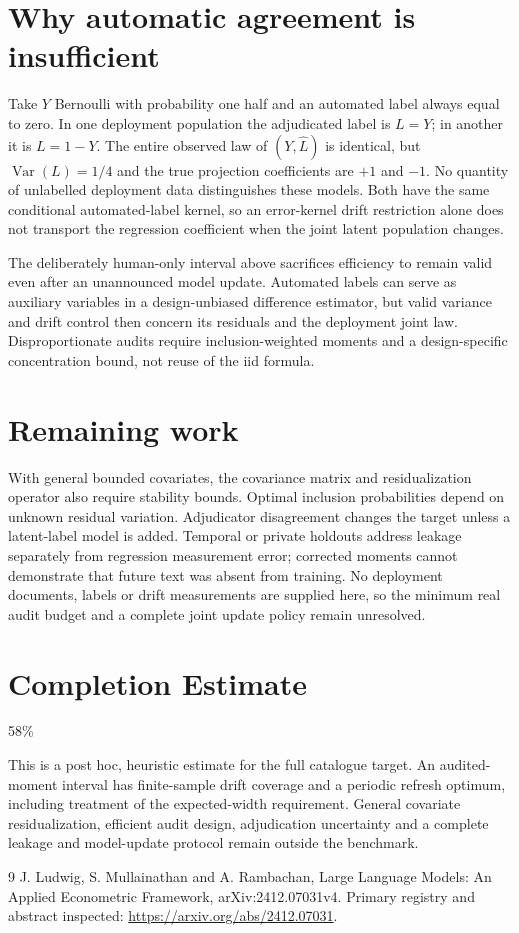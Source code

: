 \documentclass[11pt]{article}
\newcommand{\Var}{\operatorname{Var}}
\begin{document}
\section*{Why automatic agreement is insufficient}
Take $Y$ Bernoulli with probability one half and an automated label always equal to zero. In one deployment population the adjudicated label is $L=Y$; in another it is $L=1-Y$. The entire observed law of $(Y,\widehat L)$ is identical, but $\Var(L)=1/4$ and the true projection coefficients are $+1$ and $-1$. No quantity of unlabelled deployment data distinguishes these models. Both have the same conditional automated-label kernel, so an error-kernel drift restriction alone does not transport the regression coefficient when the joint latent population changes.

The deliberately human-only interval above sacrifices efficiency to remain valid even after an unannounced model update. Automated labels can serve as auxiliary variables in a design-unbiased difference estimator, but valid variance and drift control then concern its residuals and the deployment joint law. Disproportionate audits require inclusion-weighted moments and a design-specific concentration bound, not reuse of the iid formula.

\section*{Remaining work}
With general bounded covariates, the covariance matrix and residualization operator also require stability bounds. Optimal inclusion probabilities depend on unknown residual variation. Adjudicator disagreement changes the target unless a latent-label model is added. Temporal or private holdouts address leakage separately from regression measurement error; corrected moments cannot demonstrate that future text was absent from training. No deployment documents, labels or drift measurements are supplied here, so the minimum real audit budget and a complete joint update policy remain unresolved.

\section{Completion Estimate}
58\%

This is a post hoc, heuristic estimate for the full catalogue target.
An audited-moment interval has finite-sample drift coverage and a periodic refresh optimum, including treatment of the expected-width requirement. General covariate residualization, efficient audit design, adjudication uncertainty and a complete leakage and model-update protocol remain outside the benchmark.

\begin{thebibliography}{9}
 J. Ludwig, S. Mullainathan and A. Rambachan, Large Language Models: An Applied Econometric Framework, arXiv:2412.07031v4. Primary registry and abstract inspected:
\url{https://arxiv.org/abs/2412.07031}.
\end{thebibliography}
\end{document}
